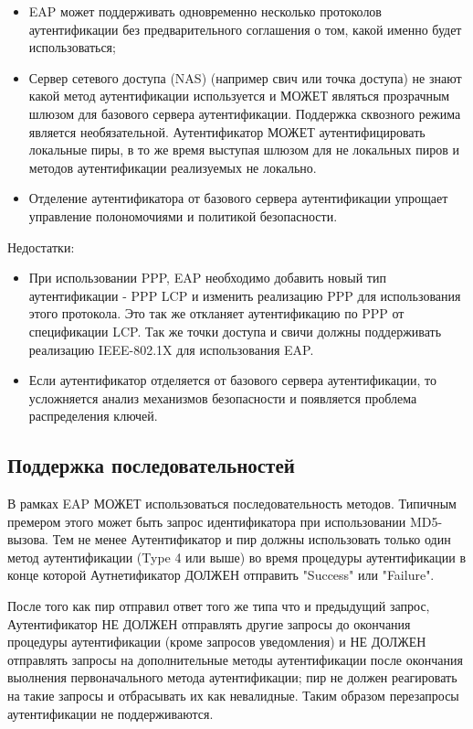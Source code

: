 \begin{itemize}
\item EAP может поддерживать одновременно несколько протоколов аутентификации без предварительного соглашения о том, какой именно будет использоваться;
\item Сервер сетевого доступа (NAS) (например свич или точка доступа) не знают какой метод аутентификации используется и МОЖЕТ являться прозрачным шлюзом для базового сервера аутентификации. Поддержка сквозного режима является необязательной. Аутентификатор МОЖЕТ аутентифицировать локальные пиры, в то же время выступая шлюзом для не локальных пиров и методов аутентификации реализуемых не локально.
\item Отделение аутентификатора от базового сервера аутентификации упрощает управление полономочиями и политикой безопасности.
\end{itemize}

Недостатки:

\begin{itemize}
\item При использовании PPP, EAP необходимо добавить новый тип аутентификации - PPP LCP и изменить реализацию PPP для использования этого протокола. Это так же откланяет аутентификацию по PPP от спецификации LCP. Так же точки доступа и свичи должны поддерживать реализацию IEEE-802.1X для использования EAP.
\item Если аутентификатор отделяется от базового сервера аутентификации, то усложняется анализ механизмов безопасности и появляется проблема распределения ключей.
\end{itemize}

\subsection{Поддержка последовательностей}

В рамках EAP МОЖЕТ использоваться последовательность методов. Типичным премером этого может быть запрос идентификатора при использовании MD5-вызова. Тем не менее Аутентификатор и пир должны использовать только один метод аутентификации (Type 4 или выше) во время процедуры аутентификации в конце которой Аутнетификатор ДОЛЖЕН отправить "Success" или "Failure".

После того как пир отправил ответ того же типа что и предыдущий запрос, Аутентификатор НЕ ДОЛЖЕН отправлять другие запросы до окончания процедуры аутентификации (кроме запросов уведомления) и НЕ ДОЛЖЕН отправлять запросы на дополнительные методы аутентификации после окончания выолнения первоначального метода аутентификации; пир не должен реагировать на такие запросы и отбрасывать их как невалидные. Таким образом перезапросы аутентификации не поддерживаются.

